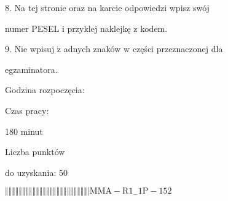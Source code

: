 \documentclass[a4paper,12pt]{article}
\begin{document}
8. Na tej stronie oraz na karcie odpowiedzi wpisz swój

numer PESEL i przyklej naklejkę z kodem.

9. Nie wpisuj $\dot{\mathrm{z}}$ adnych znaków w części przeznaczonej dla

egzaminatora.

Godzina rozpoczęcia:

Czas pracy:

180 minut

Liczba punktów

do uzyskania: 50

$\Vert\Vert\Vert\Vert\Vert\Vert\Vert\Vert\Vert\Vert\Vert\Vert\Vert\Vert\Vert\Vert\Vert\Vert\Vert\Vert\Vert\Vert\Vert\Vert|  \mathrm{M}\mathrm{M}\mathrm{A}-\mathrm{R}1_{-}1\mathrm{P}-152$
\end{document}
